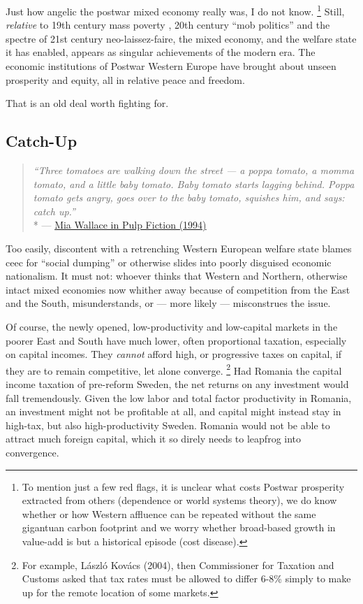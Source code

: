 Just how angelic the postwar mixed economy really was, I do not know.
\footnote{
	To mention just a few red flags, it is unclear what costs Postwar prosperity extracted from others (dependence or world systems theory), we do know whether or how Western affluence can be repeated without the same gigantuan carbon footprint and we worry whether broad-based growth in value-add is but a historical episode (cost disease).
}
Still, \emph{relative} to 19th century mass poverty \citep{MarxEngels-1848-aa}, 20th century ``mob politics'' \citep[158]{Crouch2004} and the spectre of 21st century neo-laissez-faire, the mixed economy, and the welfare state it has enabled, appears as singular achievements of the modern era.
The economic institutions of Postwar Western Europe have brought about unseen prosperity and equity, all in relative peace and freedom.

That is an old deal worth fighting for.

\subsection{Catch-Up}
\begin{quote}
	\emph{``Three tomatoes are walking down the street --- a poppa tomato, a momma tomato, and a little baby tomato.
	Baby tomato starts lagging behind.
	Poppa tomato gets angry, goes over to the baby tomato, squishes him, and says:
	catch up.''}
	\\*
	--- \href{http://www.youtube.com/watch?v=5D-QKY0-Bxk}{Mia Wallace in Pulp Fiction (1994)}
\end{quote}

Too easily, discontent with a retrenching Western European welfare state blames \gls{ceec} for ``social dumping'' %
or otherwise slides into poorly disguised economic nationalism.
It must not:
whoever thinks that Western and Northern, otherwise intact mixed economies now whither away because of competition from the East and the South, misunderstands, or --- more likely --- misconstrues the issue.

Of course, the newly opened, low-productivity and low-capital markets in the poorer East and South have much lower, often proportional taxation, especially on capital incomes.
They \emph{cannot} afford high, or progressive taxes on capital, if they are to remain competitive, let alone converge.
\footnote{
	For example, L\'{a}szl\'{o} Kov\'{a}cs (2004), then Commissioner for Taxation and Customs asked that tax rates must be allowed to differ 6-8\% simply to make up for the remote location of some markets.
}
Had Romania the capital income taxation of pre-reform Sweden, the net returns on any investment would fall tremendously.
Given the low labor and total factor productivity in Romania, an investment might not be profitable at all, and capital might instead stay in high-tax, but also high-productivity Sweden.
Romania would not be able to attract much foreign capital, which it so direly needs to leapfrog into convergence.

